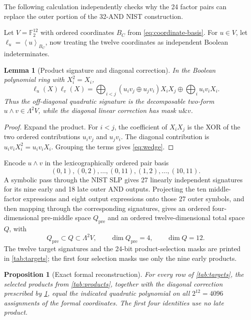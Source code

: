 \documentclass[11pt]{article}
\newtheorem{proposition}[proposition]{Proposition}
\newtheorem{lemma}[lemma]{Lemma}
\theoremstyle{definition}
\newcommand{\F}{\mathbb F}
\newcommand{\mask}[2]{\left\langle #1\right\rangle_{#2}}
\begin{document}
The following calculation independently checks why the 24 factor pairs can replace the outer portion
of the 32-AND NIST construction.

Let \(V=\F_2^{12}\) with ordered coordinates \(B_C\) from
\cref{eq:coordinate-basis}.  For \(u\in V\), let \(\ell_u=\mask{u}{B_C}\), now treating the twelve
coordinates as independent Boolean indeterminates.

\begin{lemma}[Product signature and diagonal correction]
\label{lem:wedge}
In the Boolean polynomial ring with \(X_i^2=X_i\),
\begin{equation}
 \ell_u(X)\ell_v(X)=
 \bigoplus_{i<j}(u_iv_j\oplus u_jv_i)X_iX_j
 \oplus\bigoplus_i u_iv_iX_i.
 \label{eq:wedge}
\end{equation}
Thus the off-diagonal quadratic signature is the decomposable two-form
\(u\wedge v\in\Lambda^2V\), while the diagonal linear correction has mask
\(u\mathbin{\&}v\).
\end{lemma}

\begin{proof}
Expand the product.  For \(i<j\), the coefficient of \(X_iX_j\) is the XOR of the two ordered
contributions \(u_iv_j\) and \(u_jv_i\).  The diagonal contribution is
\(u_iv_iX_i^2=u_iv_iX_i\).  Grouping the terms gives \cref{eq:wedge}.
\end{proof}

Encode \(u\wedge v\) in the lexicographically ordered pair basis
\[
 (0,1),(0,2),\ldots,(0,11),(1,2),\ldots,(10,11).
\]
A symbolic pass through the NIST SLP gives 27 linearly independent signatures for its nine early and
18 late outer AND outputs.  Projecting the ten middle-factor expressions and eight output expressions
onto those 27 outer symbols, and then mapping through the corresponding signatures, gives an ordered
four-dimensional pre-middle space \(Q_{\mathrm{pre}}\) and an ordered twelve-dimensional total space
\(Q\), with
\[
 Q_{\mathrm{pre}}\subset Q\subset\Lambda^2V,
 \qquad \dim Q_{\mathrm{pre}}=4,
 \qquad \dim Q=12.
\]
The twelve target signatures and the 24-bit product-selection masks are printed in
\cref{tab:targets}; the first four selection masks use only the nine early products.

\begin{proposition}[Exact formal reconstruction]
\label{prop:formal-certificate}
For every row of \cref{tab:targets}, the selected products from \cref{tab:products}, together with
the diagonal correction prescribed by \cref{lem:wedge}, equal the indicated quadratic polynomial on
all \(2^{12}=4096\) assignments of the formal coordinates.  The first four identities use no late
product.
\end{proposition}
\end{document}
